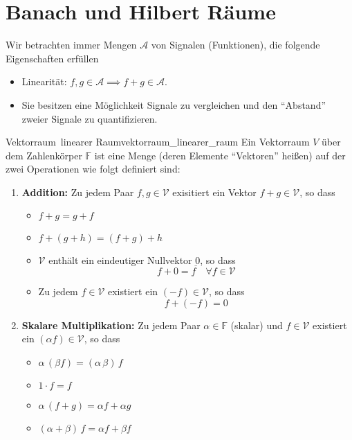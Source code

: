 \section{Banach und Hilbert Räume}

Wir betrachten immer Mengen $\mathcal{A}$ von Signalen (Funktionen), die folgende Eigenschaften erfüllen
\begin{itemize}
        \item Linearität: $f, g \in \mathcal{A} \implies f + g \in \mathcal{A}$.
        \item Sie besitzen eine Möglichkeit Signale zu vergleichen und den ``Abstand'' zweier Signale zu quantifizieren.
\end{itemize}

\begin{boringDef}{Vektorraum\, linearer Raum}{vektorraum_linearer_raum}
  Ein Vektorraum $V$ über dem Zahlenkörper $\mathbb{F}$ ist eine Menge (deren Elemente ``Vektoren'' heißen) auf der zwei Operationen wie folgt definiert sind:
  \begin{enumerate}
          \item \textbf{Addition:} Zu jedem Paar $f, g \in \mathcal{V}$ exisitiert ein Vektor $f + g \in \mathcal{V}$, so dass
          \begin{itemize}
            \item $f + g = g + f$
            \item $f + (g + h) = (f + g) + h$
            \item $\mathcal{V}$ enthält ein eindeutiger Nullvektor $\underbar{0}$, so dass
                  \begin{equation*}
                    f + 0 = f \quad \forall f \in \mathcal{V}
                  \end{equation*}
            \item Zu jedem $f \in \mathcal{V}$ existiert ein $(-f) \in \mathcal{V}$, so dass
                  \begin{equation*}
                    f + (-f) = 0
                  \end{equation*}
          \end{itemize}
    \item \textbf{Skalare Multiplikation:} Zu jedem Paar $\alpha \in \mathbb{F}$ (skalar) und $f \in \mathcal{V}$ existiert ein $(\alpha f) \in \mathcal{V}$, so dass
          \begin{itemize}
            \item $\alpha \, (\beta f) = (\alpha\,\beta) \, f$
            \item $1\cdot f = f$
            \item $\alpha \, (f + g) = \alpha f + \alpha g$
            \item $(\alpha + \beta) \, f = \alpha f + \beta f$
          \end{itemize}
  \end{enumerate}
\end{boringDef}

